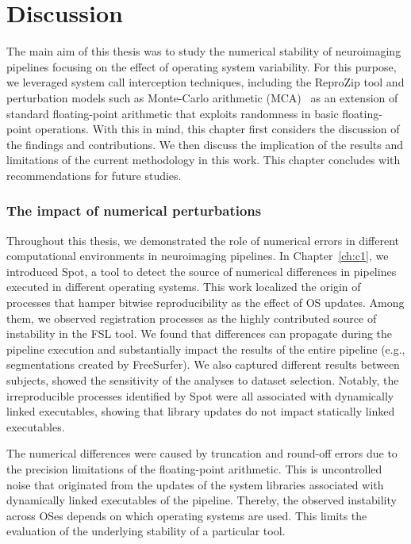 \chapter{Discussion}
\label{ch:discussion}

The main aim of this thesis was to study the numerical stability of neuroimaging pipelines focusing on the effect
of operating system variability. For this purpose, we leveraged system call interception techniques, including
the ReproZip tool and perturbation models such as Monte-Carlo arithmetic (MCA)~\cite{Parker1997-qq} as an extension of
standard floating-point arithmetic that exploits randomness in basic floating-point operations.
With this in mind, this chapter first considers the discussion of the findings and contributions.
We then discuss the implication of the results and limitations of the current methodology in this work.
This chapter concludes with recommendations for future studies.


\subsection{The impact of numerical perturbations}

Throughout this thesis, we demonstrated the role of numerical errors in different computational environments in neuroimaging pipelines.
In Chapter~\ref{ch:c1}, we introduced Spot, a tool to detect the source of numerical differences in pipelines
executed in different operating systems. 
This work localized the origin of processes that hamper bitwise reproducibility as the effect of OS updates.
Among them, we observed registration processes as the highly contributed source of instability in the FSL tool. 
We found that differences can propagate during the pipeline execution and substantially impact
the results of the entire pipeline (e.g., segmentations created by FreeSurfer).
We also captured different results between subjects, showed the sensitivity of the analyses to dataset selection.
Notably, the irreproducible processes identified by Spot were all associated with dynamically linked executables,
showing that library updates do not impact statically linked executables.


The numerical differences were caused by truncation and round-off errors
due to the precision limitations of the floating-point arithmetic.
This is uncontrolled noise that originated from the updates of the system libraries associated with
dynamically linked executables of the pipeline. Thereby, the observed instability across OSes
depends on which operating systems are used. This limits the evaluation of the underlying stability of a particular tool.

